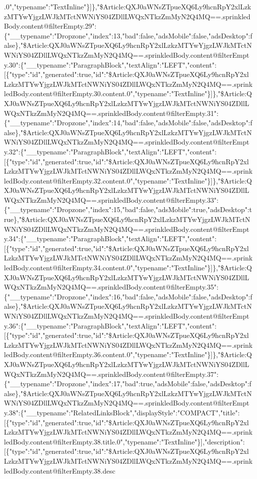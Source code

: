 .0","typename":"TextInline"\}{]}\},"\$Article:QXJ0aWNsZTpueXQ6Ly9hcnRpY2xlLzkzMTYwYjgzLWJkMTctNWNiYS04ZDllLWQxNTkzZmMyN2Q4MQ==.sprinkledBody.content@filterEmpty.29":\{"\_\_typename":"Dropzone","index":13,"bad":false,"adsMobile":false,"adsDesktop":false\},"\$Article:QXJ0aWNsZTpueXQ6Ly9hcnRpY2xlLzkzMTYwYjgzLWJkMTctNWNiYS04ZDllLWQxNTkzZmMyN2Q4MQ==.sprinkledBody.content@filterEmpty.30":\{"\_\_typename":"ParagraphBlock","textAlign":"LEFT","content":{[}\{"type":"id","generated":true,"id":"\$Article:QXJ0aWNsZTpueXQ6Ly9hcnRpY2xlLzkzMTYwYjgzLWJkMTctNWNiYS04ZDllLWQxNTkzZmMyN2Q4MQ==.sprinkledBody.content@filterEmpty.30.content.0","typename":"TextInline"\}{]}\},"\$Article:QXJ0aWNsZTpueXQ6Ly9hcnRpY2xlLzkzMTYwYjgzLWJkMTctNWNiYS04ZDllLWQxNTkzZmMyN2Q4MQ==.sprinkledBody.content@filterEmpty.31":\{"\_\_typename":"Dropzone","index":14,"bad":false,"adsMobile":false,"adsDesktop":false\},"\$Article:QXJ0aWNsZTpueXQ6Ly9hcnRpY2xlLzkzMTYwYjgzLWJkMTctNWNiYS04ZDllLWQxNTkzZmMyN2Q4MQ==.sprinkledBody.content@filterEmpty.32":\{"\_\_typename":"ParagraphBlock","textAlign":"LEFT","content":{[}\{"type":"id","generated":true,"id":"\$Article:QXJ0aWNsZTpueXQ6Ly9hcnRpY2xlLzkzMTYwYjgzLWJkMTctNWNiYS04ZDllLWQxNTkzZmMyN2Q4MQ==.sprinkledBody.content@filterEmpty.32.content.0","typename":"TextInline"\}{]}\},"\$Article:QXJ0aWNsZTpueXQ6Ly9hcnRpY2xlLzkzMTYwYjgzLWJkMTctNWNiYS04ZDllLWQxNTkzZmMyN2Q4MQ==.sprinkledBody.content@filterEmpty.33":\{"\_\_typename":"Dropzone","index":15,"bad":false,"adsMobile":true,"adsDesktop":true\},"\$Article:QXJ0aWNsZTpueXQ6Ly9hcnRpY2xlLzkzMTYwYjgzLWJkMTctNWNiYS04ZDllLWQxNTkzZmMyN2Q4MQ==.sprinkledBody.content@filterEmpty.34":\{"\_\_typename":"ParagraphBlock","textAlign":"LEFT","content":{[}\{"type":"id","generated":true,"id":"\$Article:QXJ0aWNsZTpueXQ6Ly9hcnRpY2xlLzkzMTYwYjgzLWJkMTctNWNiYS04ZDllLWQxNTkzZmMyN2Q4MQ==.sprinkledBody.content@filterEmpty.34.content.0","typename":"TextInline"\}{]}\},"\$Article:QXJ0aWNsZTpueXQ6Ly9hcnRpY2xlLzkzMTYwYjgzLWJkMTctNWNiYS04ZDllLWQxNTkzZmMyN2Q4MQ==.sprinkledBody.content@filterEmpty.35":\{"\_\_typename":"Dropzone","index":16,"bad":false,"adsMobile":false,"adsDesktop":false\},"\$Article:QXJ0aWNsZTpueXQ6Ly9hcnRpY2xlLzkzMTYwYjgzLWJkMTctNWNiYS04ZDllLWQxNTkzZmMyN2Q4MQ==.sprinkledBody.content@filterEmpty.36":\{"\_\_typename":"ParagraphBlock","textAlign":"LEFT","content":{[}\{"type":"id","generated":true,"id":"\$Article:QXJ0aWNsZTpueXQ6Ly9hcnRpY2xlLzkzMTYwYjgzLWJkMTctNWNiYS04ZDllLWQxNTkzZmMyN2Q4MQ==.sprinkledBody.content@filterEmpty.36.content.0","typename":"TextInline"\}{]}\},"\$Article:QXJ0aWNsZTpueXQ6Ly9hcnRpY2xlLzkzMTYwYjgzLWJkMTctNWNiYS04ZDllLWQxNTkzZmMyN2Q4MQ==.sprinkledBody.content@filterEmpty.37":\{"\_\_typename":"Dropzone","index":17,"bad":true,"adsMobile":false,"adsDesktop":false\},"\$Article:QXJ0aWNsZTpueXQ6Ly9hcnRpY2xlLzkzMTYwYjgzLWJkMTctNWNiYS04ZDllLWQxNTkzZmMyN2Q4MQ==.sprinkledBody.content@filterEmpty.38":\{"\_\_typename":"RelatedLinksBlock","displayStyle":"COMPACT","title":{[}\{"type":"id","generated":true,"id":"\$Article:QXJ0aWNsZTpueXQ6Ly9hcnRpY2xlLzkzMTYwYjgzLWJkMTctNWNiYS04ZDllLWQxNTkzZmMyN2Q4MQ==.sprinkledBody.content@filterEmpty.38.title.0","typename":"TextInline"\}{]},"description":{[}\{"type":"id","generated":true,"id":"\$Article:QXJ0aWNsZTpueXQ6Ly9hcnRpY2xlLzkzMTYwYjgzLWJkMTctNWNiYS04ZDllLWQxNTkzZmMyN2Q4MQ==.sprinkledBody.content@filterEmpty.38.desc